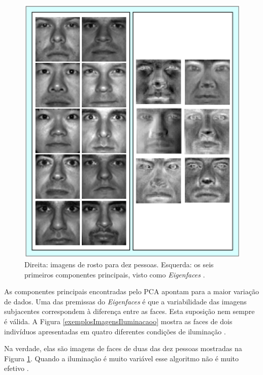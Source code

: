 	\begin{figure}[hbt]
		\begin{center}
			\includegraphics[width=12cm]{figuras/2.FundamentacaoTeorica/eigenfaces.png}
		\end{center}
		\caption{Direita: imagens de rosto para dez pessoas. Esquerda: os seis primeiros componentes principais, visto como \textit{Eigenfaces} \cite{hewitt}.}
		\label{exemploEigenfaces}
	\end{figure}

As componentes principais encontradas pelo PCA apontam para a maior variação de dados. Uma das premissas do \textit{Eigenfaces} é que a variabilidade das imagens subjacentes correspondem à diferença entre as faces. Esta suposição nem sempre é válida. A Figura \ref{exemplosImagensIluminacaoo} mostra as faces de dois indivíduos apresentadas em quatro diferentes condições de iluminação \cite{hewitt}.

Na verdade, elas são imagens de faces de duas das dez pessoas mostradas na Figura \ref{exemploEigenfaces}. Quando a iluminação é muito variável esse algoritmo não é muito efetivo \cite{hewitt}.

